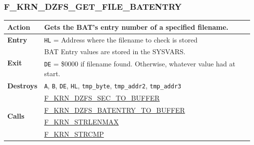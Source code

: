 \documentclass[a4paper,11pt]{article}
\begin{document}
        \subsubsection{F\_KRN\_DZFS\_GET\_FILE\_BATENTRY}
        \label{func:fkrndzfsgetfilebatentry}
        \begin{tabular}{l p{9cm}}
            \hline\textbf{Action}
            & Gets the BAT's entry number of a specified filename.\\
            \hline\textbf{Entry} & \texttt{HL} = Address where the filename to 
            check is stored\\
            \hline\multirow[t]{2}{4em}{\textbf{Exit}}
            & BAT Entry values are stored in the SYSVARS.\\
            & \texttt{DE} = \$0000 if filename found. Otherwise, whatever value
            had at start.\\
            \hline\textbf{Destroys} & \texttt{A}, \texttt{B}, \texttt{DE}, \texttt{HL},
            \texttt{tmp\_byte}, \texttt{tmp\_addr2}, \texttt{tmp\_addr3} \\
            \hline\multirow[t]{4}{4em}{\textbf{Calls}}
            & \hyperref[func:fkrndzfssectobuffer]{F\_KRN\_DZFS\_SEC\_TO\_BUFFER}\\
            & \hyperref[func:fkrndzfsbatentrytobuffer]{F\_KRN\_DZFS\_BATENTRY\_TO\_BUFFER}\\
            & \hyperref[func:fkrnstrlenmax]{F\_KRN\_STRLENMAX}\\
            & \hyperref[func:fkrnstrcmp]{F\_KRN\_STRCMP}\\
            \hline
        \end{tabular}

\end{document}
